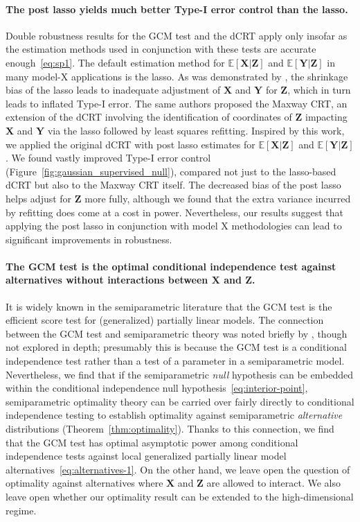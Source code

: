 \documentclass[12pt]{article}
\theoremstyle{definition}
\theoremstyle{remark}
\newcommand{\E}{\mathbb E}								%
\newcommand{\prx}{\bm X}								%
\newcommand{\prz}{\bm Z}								%
\newcommand{\pry}{{\bm Y}}								%
\begin{document}
\paragraph{The post lasso yields much better Type-I error control than the lasso.}

Double robustness results for the GCM test and the dCRT apply only insofar as the estimation methods used in conjunction with these tests are accurate enough~\eqref{eq:sp1}. The default estimation method for $\E[\prx|\prz]$ and $\E[\pry|\prz]$ in many model-X applications is the lasso. As was demonstrated by \cite{Li2022}, the shrinkage bias of the lasso leads to inadequate adjustment of $\prx$ and $\pry$ for $\prz$, which in turn leads to inflated Type-I error. The same authors proposed the Maxway CRT, an extension of the dCRT involving the identification of coordinates of $\prz$ impacting $\prx$ and $\pry$ via the lasso followed by least squares refitting. Inspired by this work, we applied the original dCRT with post lasso estimates for $\E[\prx|\prz]$ and $\E[\pry|\prz]$. We found vastly improved Type-I error control (Figure~\ref{fig:gaussian_supervised_null}), compared not just to the lasso-based dCRT but also to the Maxway CRT itself. The decreased bias of the post lasso helps adjust for $\prz$ more fully, although we found that the extra variance incurred by refitting does come at a cost in power. Nevertheless, our results suggest that applying the post lasso in conjunction with model X methodologies can lead to significant improvements in robustness.

\paragraph{The GCM test is the optimal conditional independence test against alternatives without interactions between $\prx$ and $\prz$.} 

It is widely known in the semiparametric literature that the GCM test is the efficient score test for (generalized) partially linear models. The connection between the GCM test and semiparametric theory was noted briefly by \citet{Shah2018}, though not explored in depth; presumably this is because the GCM test is a conditional independence test rather than a test of a parameter in a semiparametric model. Nevertheless, we find that if the semiparametric \textit{null} hypothesis can be embedded within the conditional independence null hypothesis~\eqref{eq:interior-point}, semiparametric optimality theory can be carried over fairly directly to conditional independence testing to establish optimality against semiparametric \textit{alternative} distributions (Theorem~\ref{thm:optimality}). Thanks to this connection, we find that the GCM test has optimal asymptotic power among conditional independence tests against local generalized partially linear model alternatives~\eqref{eq:alternatives-1}. On the other hand, we leave open the question of optimality against alternatives where $\prx$ and $\prz$ are allowed to interact. We also leave open whether our optimality result can be extended to the high-dimensional regime.
\end{document}
